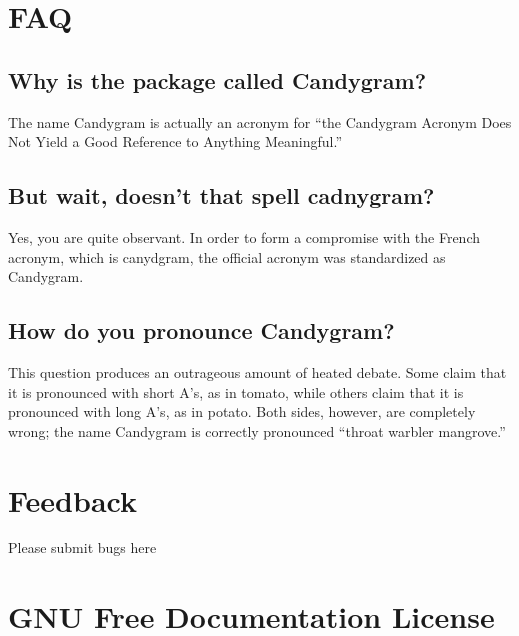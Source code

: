 \documentclass{howto}
\begin{document}
\section{FAQ}

\subsection{Why is the package called Candygram?}
The name Candygram is actually an acronym for ``the Candygram Acronym Does Not
Yield a Good Reference to Anything Meaningful.''

\subsection{But wait, doesn't that spell {\sc cadnygram}?}
Yes, you are quite observant. In order to form a compromise with the French
acronym, which is {\sc canydgram}, the official acronym was standardized as
{\sc Candygram}.

\subsection{How do you pronounce Candygram?}
This question produces an outrageous amount of heated debate. Some claim that
it is pronounced with short A's, as in tomato, while others claim that it is
pronounced with long A's, as in potato. Both sides, however, are completely
wrong; the name Candygram is correctly pronounced ``throat warbler mangrove.''



\section{Feedback}

Please submit bugs here



\appendix
\section{GNU Free Documentation License}
\label{fdl}





\end{document}

